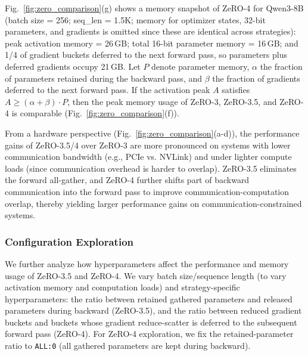 \documentclass[letterpaper,twocolumn,10pt]{article}
\begin{document}
Fig.~\ref{fig:zero_comparison}(g) shows a memory snapshot of ZeRO-4 for Qwen3-8B (batch size = 256; seq\_len = 1.5K; memory for optimizer states, 32-bit parameters, and gradients is omitted since these are identical across strategies): peak activation memory = 26\,GB; total 16-bit parameter memory = 16\,GB; and 1/4 of gradient buckets deferred to the next forward pass, so parameters plus deferred gradients occupy 21\,GB. Let $P$ denote parameter memory, $\alpha$ the fraction of parameters retained during the backward pass, and $\beta$ the fraction of gradients deferred to the next forward pass. If the activation peak $A$ satisfies $A \ge (\alpha+\beta)\cdot P$, then the peak memory usage of ZeRO-3, ZeRO-3.5, and ZeRO-4 is comparable (Fig.~\ref{fig:zero_comparison}(f)). 


From a hardware perspective (Fig.~\ref{fig:zero_comparison}(a-d)), the performance gains of ZeRO-3.5/4 over ZeRO-3 are more pronounced on systems with lower communication bandwidth (e.g., PCIe vs. NVLink) and under lighter compute loads (since communication overhead is harder to overlap). ZeRO-3.5 eliminates the forward all-gather, and ZeRO-4 further shifts part of backward communication into the forward pass to improve communication-computation overlap, thereby yielding larger performance gains on communication-constrained systems.

\subsubsection{Configuration Exploration}

We further analyze how hyperparameters affect the performance and memory usage of ZeRO-3.5 and ZeRO-4. We vary batch size/sequence length (to vary activation memory and computation loads) and strategy-specific hyperparameters: the ratio between retained gathered parameters and released parameters during backward (ZeRO-3.5), and the ratio between reduced gradient buckets and buckets whose gradient reduce-scatter is deferred to the subsequent forward pass (ZeRO-4). For ZeRO-4 exploration, we fix the retained-parameter ratio to \texttt{ALL:0} (all gathered parameters are kept during backward).
\end{document}
